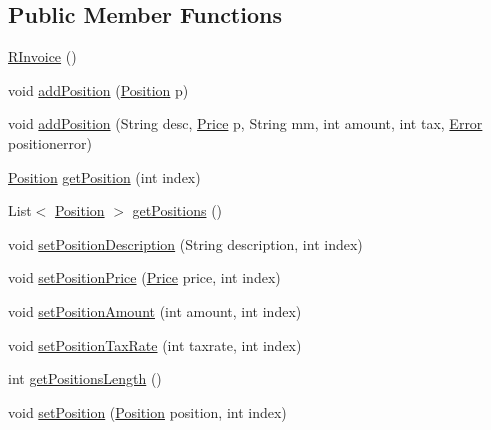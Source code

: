 \subsection*{Public Member Functions}
\begin{DoxyCompactItemize}
\item 
\hyperlink{class_reduced_invoice_1_1_r_invoice_a382c34ce7698a3e5cc9301c8cc3a5828}{R\-Invoice} ()
\item 
void \hyperlink{class_reduced_invoice_1_1_r_invoice_ae51bf96a9fc6c76ba5d79a813f4a1da0}{add\-Position} (\hyperlink{class_reduced_invoice_1_1_position}{Position} p)
\item 
void \hyperlink{class_reduced_invoice_1_1_r_invoice_ac851aecb0cdd4da309d203f0dfc4b55f}{add\-Position} (String desc, \hyperlink{class_reduced_invoice_1_1_price}{Price} p, String mm, int amount, int tax, \hyperlink{enum_reduced_invoice_1_1_a_invoice_1_1_error}{Error} positionerror)
\item 
\hyperlink{class_reduced_invoice_1_1_position}{Position} \hyperlink{class_reduced_invoice_1_1_r_invoice_a552d88c5808181f8fe3ca72772b5aff6}{get\-Position} (int index)
\item 
List$<$ \hyperlink{class_reduced_invoice_1_1_position}{Position} $>$ \hyperlink{class_reduced_invoice_1_1_r_invoice_a55b11262453617b33490afbc040761f6}{get\-Positions} ()
\item 
void \hyperlink{class_reduced_invoice_1_1_r_invoice_ab9c5e05457fa8a64a6ffcd8d6261e2a0}{set\-Position\-Description} (String description, int index)
\item 
void \hyperlink{class_reduced_invoice_1_1_r_invoice_a9c47d95997895b056a0e84741313dc0a}{set\-Position\-Price} (\hyperlink{class_reduced_invoice_1_1_price}{Price} price, int index)
\item 
void \hyperlink{class_reduced_invoice_1_1_r_invoice_ac463aa248993dd296ba9ea81356726b4}{set\-Position\-Amount} (int amount, int index)
\item 
void \hyperlink{class_reduced_invoice_1_1_r_invoice_a7b553ca5131f6059b022f9815be42c17}{set\-Position\-Tax\-Rate} (int taxrate, int index)
\item 
int \hyperlink{class_reduced_invoice_1_1_r_invoice_a3df22a621cc8ed79efa13bcb6284cadc}{get\-Positions\-Length} ()
\item 
void \hyperlink{class_reduced_invoice_1_1_r_invoice_a263bac524d7b762b58c124def1a20325}{set\-Position} (\hyperlink{class_reduced_invoice_1_1_position}{Position} position, int index)
\end{DoxyCompactItemize}
